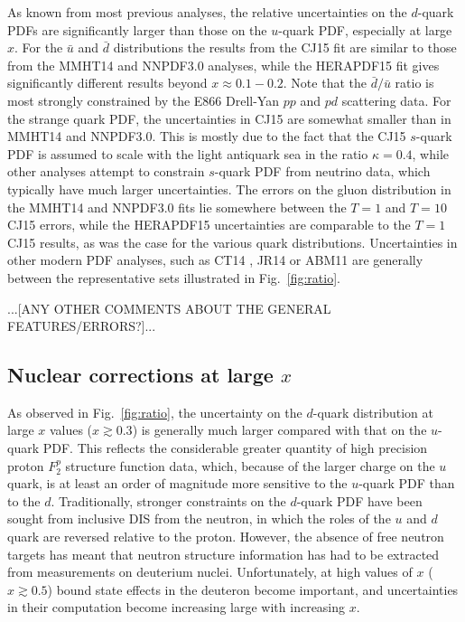 \documentclass[aps,prd,amsmath,preprint]{revtex4}
\begin{document}
As known from most previous analyses, the relative uncertainties
on the $d$-quark PDFs are significantly larger than those on the
$u$-quark PDF, especially at large $x$.
%
For the $\bar u$ and $\bar d$ distributions the results from the
CJ15 fit are similar to those from the MMHT14 and NNPDF3.0 analyses,
while the HERAPDF15 fit gives significantly different results beyond
$x \approx 0.1-0.2$.  Note that the $\bar d/\bar u$ ratio is most
strongly constrained by the E866 Drell-Yan $pp$ and $pd$ scattering
data.
%
For the strange quark PDF, the uncertainties in CJ15 are somewhat
smaller than in MMHT14 and NNPDF3.0.  This is mostly due to the
fact that the CJ15 $s$-quark PDF is assumed to scale with the
light antiquark sea in the ratio $\kappa=0.4$, while other analyses
attempt to constrain $s$-quark PDF from neutrino data, which typically
have much larger uncertainties.
%
The errors on the gluon distribution in the MMHT14 and NNPDF3.0 fits
lie somewhere between the $T=1$ and $T=10$ CJ15 errors, while the
HERAPDF15 uncertainties are comparable to the $T=1$ CJ15 results,
as was the case for the various quark distributions.
%
Uncertainties in other modern PDF analyses, such as CT14 \cite{CT14},
JR14 \cite{JR14} or ABM11 \cite{ABM11} are generally between the
representative sets illustrated in Fig.~\ref{fig:ratio}.

{\color{red} ...[ANY OTHER COMMENTS ABOUT THE GENERAL FEATURES/ERRORS?]...}


\subsection{Nuclear corrections at large $x$}
\label{ssec:largex}

As observed in Fig.~\ref{fig:ratio}, the uncertainty on the $d$-quark
distribution at large $x$ values ($x \gtrsim 0.3$) is generally much
larger compared with that on the $u$-quark PDF.
This reflects the considerable greater quantity of high precision
proton $F_2^p$ structure function data, which, because of the larger
charge on the $u$ quark, is at least an order of magnitude more
sensitive to the $u$-quark PDF than to the $d$.
Traditionally, stronger constraints on the $d$-quark PDF have been
sought from inclusive DIS from the neutron, in which the roles of
the $u$ and $d$ quark are reversed relative to the proton.  However,
the absence of free neutron targets has meant that neutron structure
information has had to be extracted from measurements on deuterium
nuclei.  Unfortunately, at high values of $x$ ($x \gtrsim 0.5$) bound
state effects in the deuteron become important, and uncertainties in
their computation become increasing large with increasing $x$.
\end{document}
